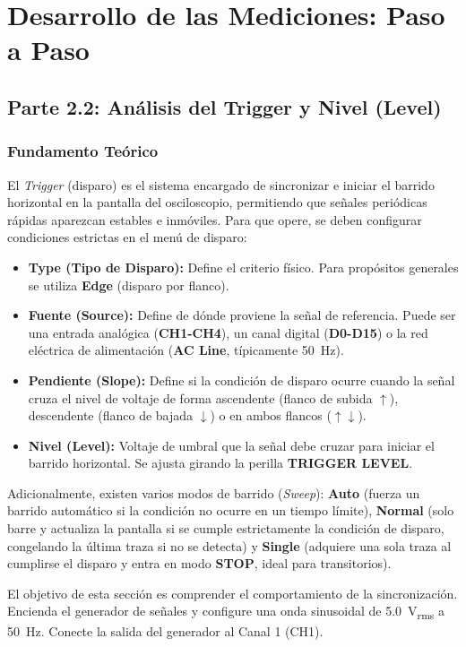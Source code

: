 \documentclass[12pt, letterpaper]{article}
\begin{document}
\section{Desarrollo de las Mediciones: Paso a Paso}

\subsection{Parte 2.2: Análisis del Trigger y Nivel (Level)}

\subsubsection*{Fundamento Teórico}
El \textit{Trigger} (disparo) es el sistema encargado de sincronizar e iniciar el barrido horizontal en la pantalla del osciloscopio, permitiendo que señales periódicas rápidas aparezcan estables e inmóviles. Para que opere, se deben configurar condiciones estrictas en el menú de disparo:
\begin{itemize}[noitemsep, topsep=0pt]
    \item \textbf{Type (Tipo de Disparo):} Define el criterio físico. Para propósitos generales se utiliza \textbf{Edge} (disparo por flanco).
    \item \textbf{Fuente (Source):} Define de dónde proviene la señal de referencia. Puede ser una entrada analógica (\textbf{CH1-CH4}), un canal digital (\textbf{D0-D15}) o la red eléctrica de alimentación (\textbf{AC Line}, típicamente \SI{50}{Hz}).
    \item \textbf{Pendiente (Slope):} Define si la condición de disparo ocurre cuando la señal cruza el nivel de voltaje de forma ascendente (flanco de subida $\uparrow$), descendente (flanco de bajada $\downarrow$) o en ambos flancos ($\uparrow\downarrow$).
    \item \textbf{Nivel (Level):} Voltaje de umbral que la señal debe cruzar para iniciar el barrido horizontal. Se ajusta girando la perilla \textbf{TRIGGER LEVEL}.
\end{itemize}
Adicionalmente, existen varios modos de barrido (\textit{Sweep}): \textbf{Auto} (fuerza un barrido automático si la condición no ocurre en un tiempo límite), \textbf{Normal} (solo barre y actualiza la pantalla si se cumple estrictamente la condición de disparo, congelando la última traza si no se detecta) y \textbf{Single} (adquiere una sola traza al cumplirse el disparo y entra en modo \textbf{STOP}, ideal para transitorios).

El objetivo de esta sección es comprender el comportamiento de la sincronización. Encienda el generador de señales y configure una onda sinusoidal de \SI{5.0}{V_{rms}} a \SI{50}{Hz}. Conecte la salida del generador al Canal 1 (CH1).
\end{document}
